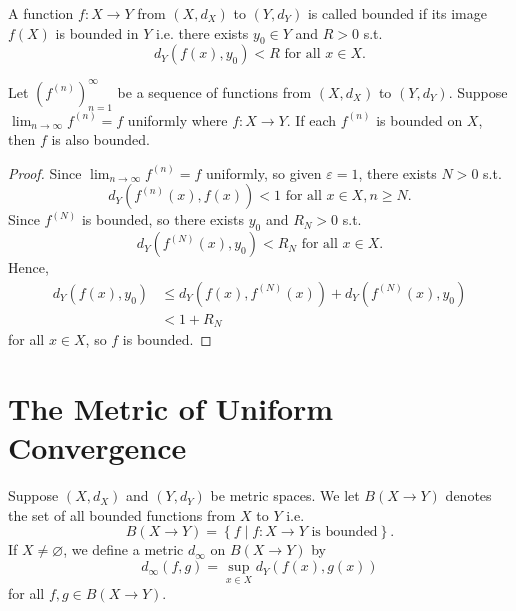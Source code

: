 \begin{definition} \label{def: bounded function}
    A function \(f:X \to Y\) from \((X, d_X)\) to \((Y, d_Y)\) is called bounded if its image \(f(X)\) is bounded in \(Y\) i.e. there exists \(y_0 \in Y\) and \(R > 0\) s.t. 
    \[
        d_Y \left( f(x), y_0 \right) < R \text{ for all } x \in X.  
    \]      
\end{definition}

\begin{proposition} \label{prop: uniformly convergence preserve bounded}
    Let \(\left( f^{(n)} \right)_{n=1}^{\infty}  \) be a sequence of functions from \((X, d_X)\) to \((Y, d_Y)\). Suppose \(\lim_{n \to \infty} f^{(n)} = f \) uniformly where \(f:X \to Y\). If each \(f^{(n)}\) is bounded on \(X\), then \(f\) is also bounded.       
\end{proposition}
\begin{proof}
    Since \(\lim_{n \to \infty} f^{(n)} = f \) uniformly, so given \(\varepsilon = 1\), there exists \(N > 0\) s.t. 
    \[
        d_Y \left( f^{(n)}(x), f(x) \right) < 1 \text{ for all } x \in X, n \ge N.  
    \] Since \(f^{(N)}\) is bounded, so there exists \(y_0\) and \(R_N > 0\) s.t. 
    \[
        d_Y \left( f^{(N)}(x), y_0 \right) < R_N \text{ for all } x \in X.  
    \] 
    Hence, 
    \begin{align*}
        d_Y \left( f(x), y_0 \right) &\le d_Y \left( f(x), f^{(N)}(x) \right) + d_Y \left( f^{(N)}(x), y_0 \right) \\
        &< 1 + R_N   
    \end{align*}
    for all \(x \in X\), so \(f\) is bounded.    
\end{proof}

\section{The Metric of Uniform Convergence}
\begin{definition}
    Suppose \((X, d_X)\) and \((Y, d_Y)\) be metric spaces. We let \(B(X \to Y)\) denotes the set of all bounded functions from \(X\) to \(Y\) i.e. 
    \[
        B(X \to Y) = \left\{ f \mid f:X \to Y \text{ is  bounded}  \right\}. 
    \] 
    If \(X \neq \varnothing \), we define a metric \(d_\infty \) on \(B(X \to Y)\) by 
    \[
        d_\infty \left( f, g \right) = \sup _{x \in X} d_Y (f(x), g(x)) 
    \] for all \(f, g \in B(X \to Y)\).     
\end{definition}

